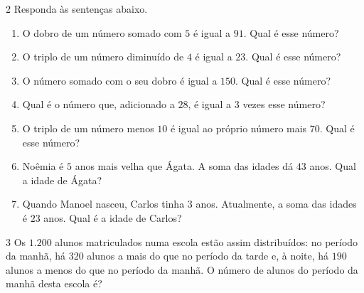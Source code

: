 








\num{2}  Responda às sentenças abaixo.

\begin{enumerate}\def\labelenumi{\alph{enumi})}
\item O dobro de um número somado com $5$ é igual a $91$. Qual é esse número?

\item O triplo de um número diminuído de $4$ é igual a $23$. Qual é esse
número?

\item O número somado com o seu dobro é igual a $150$. Qual é esse número?

\item Qual é o número que, adicionado a $28$, é igual a $3$ vezes esse número?

\item O triplo de um número menos $10$ é igual ao próprio número mais $70$.
Qual é esse número?

\item Noêmia é $5$ anos mais velha que Ágata. A soma das idades dá $43$ anos.
Qual a idade de Ágata?

\item Quando Manoel nasceu, Carlos tinha $3$ anos. Atualmente, a soma das
idades é $23$ anos. Qual é a idade de Carlos?
\end{enumerate}









\num{3}  Os $1.200$ alunos matriculados numa escola estão assim distribuídos: no
período da manhã, há $320$ alunos a mais do que no período da tarde e, à
noite, há $190$ alunos a menos do que no período da manhã. O número de
alunos do período da manhã desta escola é?

